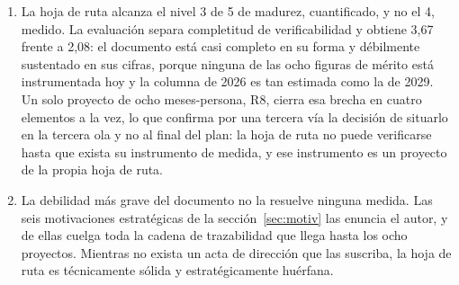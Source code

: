 \documentclass[11pt,letterpaper]{article}
\begin{document}
\begin{enumerate}
    esperar de una tecnología cuya curva S pasó su inflexión hace catorce
    años. Las incertidumbres que quedan son de volumen, de diseño de interfaz,
    de coste y de adopción humana, no de física ni de algoritmo. El panorama
    de publicaciones lo confirma por otra vía: ningún trabajo posterior a 2016
    introduce una propiedad nueva de la tecnología.
  \item La hoja de ruta alcanza el nivel 3 de 5 de madurez, cuantificado, y no
    el 4, medido. La evaluación separa completitud de verificabilidad y
    obtiene 3,67 frente a 2,08: el documento está casi completo en su forma y
    débilmente sustentado en sus cifras, porque ninguna de las ocho figuras de
    mérito está instrumentada hoy y la columna de 2026 es tan estimada como la
    de 2029. Un solo proyecto de ocho meses-persona, R8, cierra esa brecha en
    cuatro elementos a la vez, lo que confirma por una tercera vía la decisión
    de situarlo en la tercera ola y no al final del plan: la hoja de ruta no
    puede verificarse hasta que exista su instrumento de medida, y ese
    instrumento es un proyecto de la propia hoja de ruta.
  \item La debilidad más grave del documento no la resuelve ninguna medida.
    Las seis motivaciones estratégicas de la sección~\ref{sec:motiv} las
    enuncia el autor, y de ellas cuelga toda la cadena de trazabilidad que
    llega hasta los ocho proyectos. Mientras no exista un acta de dirección
    que las suscriba, la hoja de ruta es técnicamente sólida y
    estratégicamente huérfana.
\end{enumerate}

\printbibliography[heading=bibintoc,title={Referencias bibliográficas}]
\end{document}
